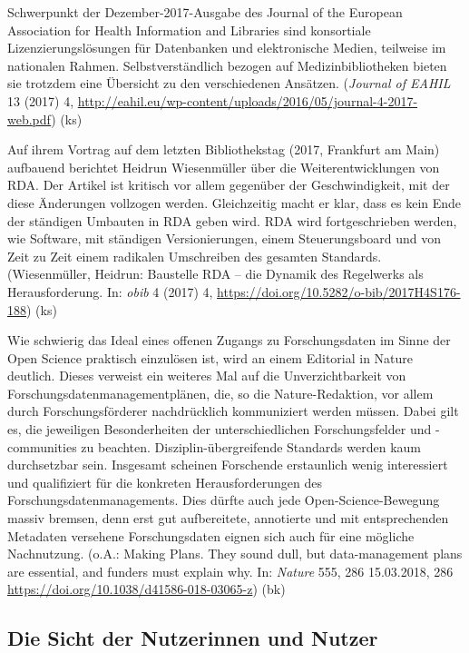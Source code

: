 \documentclass[a4paper,
fontsize=11pt,
oneside,
numbers=noperiodatend,
parskip=half-,
bibliography=totoc,
final
]{scrartcl}
\begin{document}
Schwerpunkt der Dezember-2017-Ausgabe des Journal of the European
Association for Health Information and Libraries sind konsortiale
Lizenzierungslösungen für Datenbanken und elektronische Medien,
teilweise im nationalen Rahmen. Selbstverständlich bezogen auf
Medizinbibliotheken bieten sie trotzdem eine Übersicht zu den
verschiedenen Ansätzen. (\emph{Journal of EAHIL} 13 (2017) 4,
\url{http://eahil.eu/wp-content/uploads/2016/05/journal-4-2017-web.pdf})
(ks)

Auf ihrem Vortrag auf dem letzten Bibliothekstag (2017, Frankfurt am
Main) aufbauend berichtet Heidrun Wiesenmüller über die
Weiterentwicklungen von RDA. Der Artikel ist kritisch vor allem
gegenüber der Geschwindigkeit, mit der diese Änderungen vollzogen
werden. Gleichzeitig macht er klar, dass es kein Ende der ständigen
Umbauten in RDA geben wird. RDA wird fortgeschrieben werden, wie
Software, mit ständigen Versionierungen, einem Steuerungsboard und von
Zeit zu Zeit einem radikalen Umschreiben des gesamten Standards.
(Wiesenmüller, Heidrun: Baustelle RDA -- die Dynamik des Regelwerks als
Herausforderung. In: \emph{o\textbar{}bib} 4 (2017) 4,
\url{https://doi.org/10.5282/o-bib/2017H4S176-188}) (ks)

Wie schwierig das Ideal eines offenen Zugangs zu Forschungsdaten im
Sinne der Open Science praktisch einzulösen ist, wird an einem Editorial
in Nature deutlich. Dieses verweist ein weiteres Mal auf die
Unverzichtbarkeit von Forschungsdatenmanagementplänen, die, so die
Nature-Redaktion, vor allem durch Forschungsförderer nachdrücklich
kommuniziert werden müssen. Dabei gilt es, die jeweiligen Besonderheiten
der unterschiedlichen Forschungsfelder und -communities zu beachten.
Disziplin-übergreifende Standards werden kaum durchsetzbar sein.
Insgesamt scheinen Forschende erstaunlich wenig interessiert und
qualifiziert für die konkreten Herausforderungen des
Forschungsdatenmanagements. Dies dürfte auch jede Open-Science-Bewegung
massiv bremsen, denn erst gut aufbereitete, annotierte und mit
entsprechenden Metadaten versehene Forschungsdaten eignen sich auch für
eine mögliche Nachnutzung. (o.A.: Making Plans. They sound dull, but
data-management plans are essential, and funders must explain why. In:
\emph{Nature} 555, 286 15.03.2018, 286
\url{https://doi.org/10.1038/d41586-018-03065-z}) (bk)

\hypertarget{die-sicht-der-nutzerinnen-und-nutzer}{%
\subsection{Die Sicht der Nutzerinnen und
Nutzer}\label{die-sicht-der-nutzerinnen-und-nutzer}}
\end{document}
